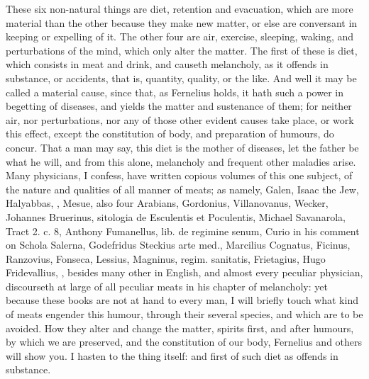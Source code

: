 {{These six non-natural things are diet, retention and evacuation, which
are more material than the other because they make new matter, or else
are conversant in keeping or expelling of it. The other four are air,
exercise, sleeping, waking, and perturbations of the mind, which only
alter the matter. The first of these is diet, which consists in meat
and drink, and causeth melancholy, as it offends in substance, or
accidents, that is, quantity, quality, or the like. And well it may be
called a material cause, since that, as Fernelius holds, it hath
such a power in begetting of diseases, and yields the matter and
sustenance of them; for neither air, nor perturbations, nor any of
those other evident causes take place, or work this effect, except the
constitution of body, and preparation of humours, do concur. That a man
may say, this diet is the mother of diseases, let the father be what he
will, and from this alone, melancholy and frequent other maladies
arise. Many physicians, I confess, have written copious volumes of this
one subject, of the nature and qualities of all manner of meats; as
namely, Galen, Isaac the Jew, Halyabbas, \Avicenna{}, Mesue, also four
Arabians, Gordonius, Villanovanus, Wecker, Johannes Bruerinus,
sitologia de Esculentis et Poculentis, Michael Savanarola, Tract 2. c.
8, Anthony Fumanellus, lib. de regimine senum, Curio in his comment on
Schola Salerna, Godefridus Steckius arte med., Marcilius Cognatus,
Ficinus, Ranzovius, Fonseca, Lessius, Magninus, regim. sanitatis,
Frietagius, Hugo Fridevallius, \etc{}, besides many other in
English, and almost every peculiar physician, discourseth at
large of all peculiar meats in his chapter of melancholy: yet because
these books are not at hand to every man, I will briefly touch what
kind of meats engender this humour, through their several species, and
which are to be avoided. How they alter and change the matter, spirits
first, and after humours, by which we are preserved, and the
constitution of our body, Fernelius and others will show you. I hasten
to the thing itself: and first of such diet as offends in substance.

}}
